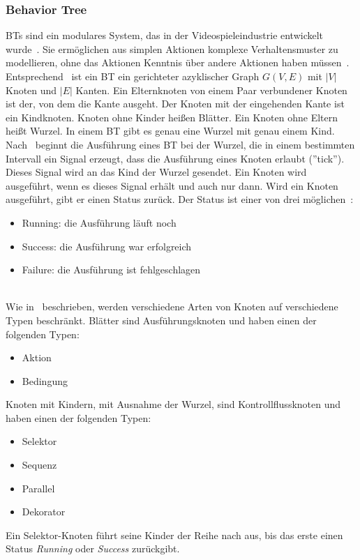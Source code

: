 \subsubsection{Behavior Tree}
\acp{BT} sind ein modulares System, das in der Videospieleindustrie entwickelt wurde~\cite{bt_book}.
Sie ermöglichen aus simplen Aktionen komplexe Verhaltensmuster zu modellieren, ohne das Aktionen Kenntnis über andere Aktionen haben müssen~\cite{bt_robotics}.
Entsprechend~\cite{bt_1} ist ein \ac{BT} ein gerichteter azyklischer Graph $G(V,E)$ mit $|V|$ Knoten und $|E|$ Kanten.
Ein Elternknoten von einem Paar verbundener Knoten ist der, von dem die Kante ausgeht.
Der Knoten mit der eingehenden Kante ist ein Kindknoten.
Knoten ohne Kinder heißen Blätter.
Ein Knoten ohne Eltern heißt Wurzel.
In einem \ac{BT} gibt es genau eine Wurzel mit genau einem Kind.\\
Nach~\cite{bt_book} beginnt die Ausführung eines \ac{BT} bei der Wurzel, die in einem bestimmten Intervall ein Signal erzeugt, dass die Ausführung eines Knoten erlaubt (''tick'').
Dieses Signal wird an das Kind der Wurzel gesendet.
Ein Knoten wird ausgeführt, wenn es dieses Signal erhält und auch nur dann.
Wird ein Knoten ausgeführt, gibt er einen Status zurück.
Der Status ist einer von drei möglichen~\cite{bt_uav}:
\begin{itemize}
    \item Running: die Ausführung läuft noch
    \item Success: die Ausführung war erfolgreich
    \item Failure: die Ausführung ist fehlgeschlagen
\end{itemize}\\
Wie in~\cite{bt_1} beschrieben, werden verschiedene Arten von Knoten auf verschiedene Typen beschränkt.
Blätter sind Ausführungsknoten und haben einen der folgenden Typen:
\begin{itemize}
    \item Aktion
    \item Bedingung
\end{itemize}
Knoten mit Kindern, mit Ausnahme der Wurzel, sind Kontrollflussknoten und haben einen der folgenden Typen:
\begin{itemize}
    \item Selektor
    \item Sequenz
    \item Parallel
    \item Dekorator
\end{itemize}
Ein Selektor-Knoten führt seine Kinder der Reihe nach aus, bis das erste einen Status \emph{Running} oder \emph{Success} zurückgibt.
